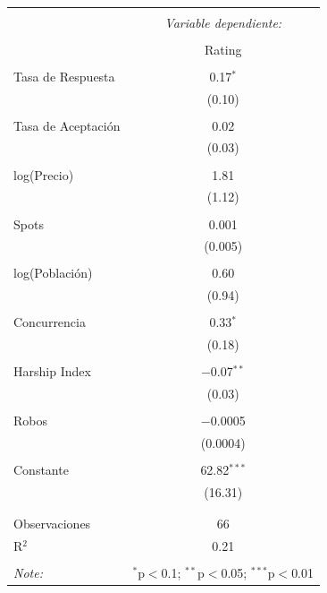 \documentclass[10.5pt]{article}   %
\begin{document}
\begin{table}[!htbp] \centering 
  \caption{} 
  \label{} 
\begin{tabular}{@{\extracolsep{5pt}}lc} 
\\[-1.8ex]\hline 
\hline \\[-1.8ex] 
 & \multicolumn{1}{c}{\textit{Variable dependiente:}} \\ 
\cline{2-2} 
\\[-1.8ex] & Rating \\ 
\hline \\[-1.8ex] 
Tasa de Respuesta & 0.17$^{*}$ \\ 
  & (0.10) \\ 
  & \\ 
Tasa de Aceptación & 0.02 \\ 
  & (0.03) \\ 
  & \\ 
 log(Precio) & 1.81 \\ 
  & (1.12) \\ 
  & \\ 
 Spots & 0.001 \\ 
  & (0.005) \\ 
  & \\ 
 log(Población) & 0.60 \\ 
  & (0.94) \\ 
  & \\ 
 Concurrencia & 0.33$^{*}$ \\ 
  & (0.18) \\ 
  & \\ 
 Harship Index & $-$0.07$^{**}$ \\ 
  & (0.03) \\ 
  & \\ 
 Robos & $-$0.0005 \\ 
  & (0.0004) \\ 
  & \\ 
 Constante & 62.82$^{***}$ \\ 
  & (16.31) \\ 
  & \\ 
\hline \\[-1.8ex] 
Observaciones & 66 \\ 
R$^{2}$ & 0.21 \\ 
\hline 
\hline \\[-1.8ex] 
\textit{Note:}  & \multicolumn{1}{r}{$^{*}$p$<$0.1; $^{**}$p$<$0.05; $^{***}$p$<$0.01} \\ 
\end{tabular} 
\end{table}
\end{document}
